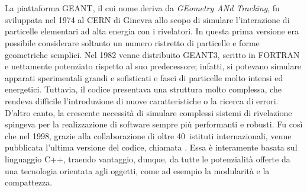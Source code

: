 
\section{}


La piattaforma GEANT, il cui nome deriva da \emph{GEometry ANd Tracking}, fu sviluppata nel 1974 al CERN di Ginevra allo scopo di simulare l'interazione di particelle elementari ad alta energia con i rivelatori.
In questa prima versione era possibile considerare soltanto un numero ristretto di particelle e forme geometriche semplici. 
Nel 1982 venne distribuito GEANT3, scritto in FORTRAN e nettamente potenziato rispetto al suo predecessore; infatti, si potevano simulare apparati sperimentali grandi e sofisticati e fasci di particelle molto intensi ed energetici.
Tuttavia, il codice presentava una struttura molto complessa, che rendeva difficile l'introduzione di nuove caratteristiche o la ricerca di errori.
%
D'altro canto, la crescente necessità di simulare complessi sistemi di rivelazione spingeva per la realizzazione di software sempre più performanti e robusti.
Fu così che nel 1998, grazie alla collaborazione di oltre 40~istituti internazionali, venne pubblicata l'ultima versione del codice, chiamata \geant.
Essa è interamente basata sul linguaggio C++, traendo vantaggio, dunque, da tutte le potenzialità offerte da una tecnologia orientata agli oggetti, come ad esempio la modularità e la compattezza.

